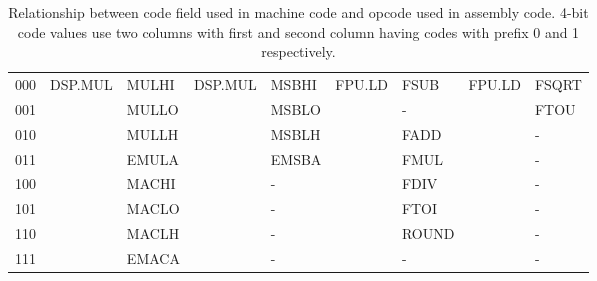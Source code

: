 \begin{table}
\begin{center}
\begin{tabular}{l|ll|ll|ll|ll}
000  & DSP.MUL    & MULHI    & DSP.MUL   & MSBHI           & FPU.LD     & FSUB            & FPU.LD     & FSQRT     \\
001  &            & MULLO    &           & MSBLO           &            & -               &            & FTOU      \\
010  &            & MULLH    &           & MSBLH           &            & FADD            &            & -         \\
011  &            & EMULA    &           & EMSBA           &            & FMUL            &            & -         \\
100  &            & MACHI    &           & -               &            & FDIV            &            & -         \\
101  &            & MACLO    &           & -               &            & FTOI            &            & -         \\
110  &            & MACLH    &           & -               &            & ROUND           &            & -         \\
111  &            & EMACA    &           & -               &            & -               &            & -         \\ \hline
\end{tabular}
\end{center}
\captionsetup{font=tiny, labelfont=tiny}
\caption{Relationship between code field used in machine code and opcode used in assembly code.
4-bit code values use two columns with first and second column having codes with prefix 0 and 
1 respectively.}
\end{table}



